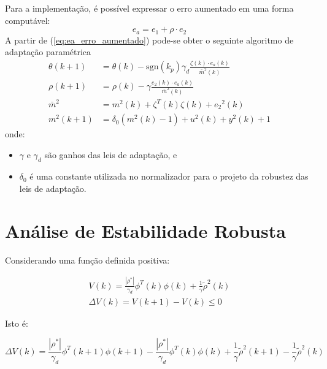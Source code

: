     Para a implementação, é possível expressar o erro aumentado em uma forma computável:
    \begin{equation}
        e_a = e_1 + \rho \cdot e_2
        \label{eq:erro_aumentado_computavel}
    \end{equation}
    A partir de (\ref{eq:ea_erro_aumentado}) pode-se obter o seguinte algoritmo de adaptação
    paramétrica
    \begin{equation}
        \begin{split}
            \theta(k+1) &= \theta(k) - \mathrm{sgn}(k_p) \gamma_d \frac{\zeta(k) \cdot e_a(k)}{{\bar{m}}^2(k)} \\
            \rho(k+1) &= \rho(k) - \gamma \frac{e_2(k) \cdot e_a(k)}{{\bar{m}}^2(k)} \\
            {\bar{m}}^2 &= m^2(k) + \zeta^T(k) \zeta(k) + {e_2}^2(k) \\
            m^2(k+1) &=  \delta_0(m^2(k) - 1) + u^2(k) + y^2(k) + 1
        \end{split}
        \label{eq:equacoes_algoritmo_adaptativo}
    \end{equation}
    onde:
    \begin{itemize}[leftmargin=+2cm]
        \item[] $\gamma$ e $\gamma_d$ são ganhos das leis de adaptação, e
        \item[] $\delta_0$ é uma constante utilizada no normalizador para o projeto
            da robustez das leis de adaptação.
    \end{itemize}

\section{Análise de Estabilidade Robusta}

    Considerando uma função definida positiva:

    \begin{equation}
        \begin{split}
            V(k) = \frac{|\rho^*|}{\gamma_d} \phi^T(k) \phi(k) + \frac{1}{\gamma} {\tilde{\rho}}^2(k) \\
            \Delta V(k) = V(k+1) - V(k) \leq 0
        \end{split}
    \end{equation}

    Isto é:

    \begin{equation}
        \Delta V(k) = \frac{|\rho^*|}{\gamma_d} \phi^T(k+1) \phi(k+1) - \frac{|\rho^*|}{\gamma_d} \phi^T(k) \phi(k)
            + \frac{1}{\gamma} {\tilde{\rho}}^2(k+1) - \frac{1}{\gamma} {\tilde{\rho}}^2(k)
        \label{eq:delta_v}
    \end{equation}

